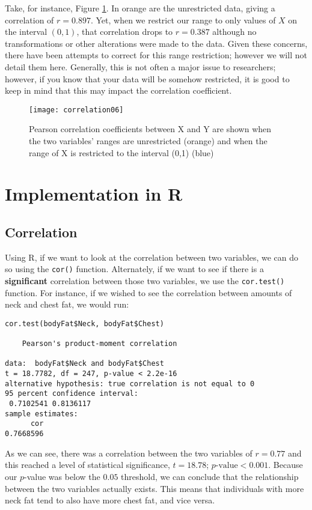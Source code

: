 Take, for instance, Figure \ref{fig:correlation06}. In orange are the unrestricted data, giving a correlation of $r=0.897$. Yet, when we restrict our range to only values of $X$ on the interval $(0,1)$, that correlation drops to $r=0.387$ although no transformations or other alterations were made to the data. Given these concerns, there have been attempts to correct for this range restriction; however we will not detail them here. Generally, this is not often a major issue to researchers; however, if you know that your data will be somehow restricted, it is good to keep in mind that this may impact the correlation coefficient.

\begin{figure}[htp]
	\texttt{[image: correlation06]}
	\caption{Pearson correlation coefficients between X and Y are shown when the two variables' ranges are unrestricted (orange) and when the range of X is restricted to the interval (0,1) (blue)}
	\label{fig:correlation06}
\end{figure}

\section{Implementation in R}

\subsection{Correlation}
Using R, if we want to look at the correlation between two variables, we can do so using the \verb|cor()| function. Alternately, if we want to see if there is a \textbf{significant} correlation between those two variables, we use the \verb|cor.test()| function. For instance, if we wished to see the correlation between amounts of neck and chest fat, we would run:

\begin{framed}
\begin{Verbatim}[samepage=TRUE]
cor.test(bodyFat$Neck, bodyFat$Chest)

	Pearson's product-moment correlation

data:  bodyFat$Neck and bodyFat$Chest
t = 18.7782, df = 247, p-value < 2.2e-16
alternative hypothesis: true correlation is not equal to 0
95 percent confidence interval:
 0.7102541 0.8136117
sample estimates:
      cor 
0.7668596 
\end{Verbatim}
\end{framed}

As we can see, there was a correlation between the two variables of $r=0.77$ and this reached a level of statistical significance, $t = 18.78$; $p\text{-value}<0.001$. Because our $p$-value was below the $0.05$ threshold, we can conclude that the relationship between the two variables actually exists. This means that individuals with more neck fat tend to also have more chest fat, and vice versa.

